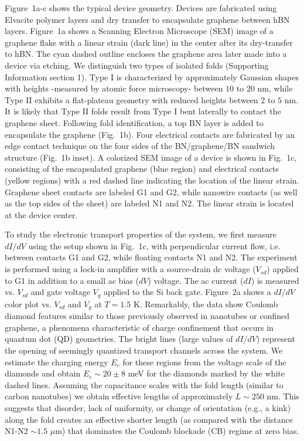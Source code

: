 \documentclass[journal=jacsat,manuscript=article]{achemso}
\begin{document}
Figure~1a-c shows the typical device geometry. Devices are fabricated using Elvacite polymer layers and dry transfer to encapsulate graphene between hBN layers\cite{wang2013one}. Figure~1a shows a Scanning Electron Microscope (SEM) image of a graphene flake with a linear strain (dark line) in the center after its dry-transfer to hBN. The cyan dashed outline encloses the graphene area later made into a device via etching. We distinguish two types of isolated folds (Supporting Information section 1)\cite{Zhu2012}. Type I is characterized by approximately Gaussian shapes with heights -measured by atomic force microscopy- between $10$ to $20$ nm, while Type II exhibits a flat-plateau geometry with reduced heights between $2$ to $5$ nm. It is likely that Type II folds result from Type I bent laterally to contact the graphene sheet\cite{Zhu2012}. Following fold identification, a top BN layer is added to encapsulate the graphene (Fig.~1b). Four electrical contacts are fabricated by an edge contact technique\cite{wang2013one} on the four sides of the BN/graphene/BN sandwich structure (Fig.~1b inset). A colorized SEM image of a device is shown in Fig.~1c, consisting of the encapsulated graphene (blue region) and electrical contacts (yellow regions) with a red dashed line indicating the location of the linear strain. Graphene sheet contacts are labeled G1 and G2, while nanowire contacts (as well as the top sides of the sheet) are labeled N1 and N2. The linear strain is located at the device center. 


To study the electronic transport properties of the system, we first measure $dI/dV$ using the setup shown in Fig.~1c, with perpendicular current flow, i.e. between contacts G1 and G2, while floating contacts N1 and N2. The experiment is performed using a lock-in amplifier with a source-drain dc voltage ($V_{sd}$) applied to G1 in addition to a small ac bias ($dV$) voltage. The ac current ($dI$) is measured vs. $V_{sd}$ and gate voltage $V_{g}$ applied to the Si back gate. Figure~2a shows a $dI/dV$ color plot  vs. $V_{sd}$ and $V_{g}$ at $T = 1.5$ K. Remarkably, the data show Coulomb diamond features similar to those previously observed in nanotubes\cite{laird_quantum_2015} or confined graphene\cite{ponomarenko2008chaotic}, a phenomena characteristic of charge confinement that occurs in quantum dot (QD) geometries. The bright lines (large values of $dI/dV$)  represent the opening of seemingly quantized transport channels across the system. We estimate the charging energy $E_{c}$ for these regions from the voltage scale of the diamonds\cite{Kouwenhoven1997} and obtain $E_c\sim 20\pm 8$ meV for the diamonds marked by the white dashed lines. Assuming the capacitance scales with the fold length (similar to carbon nanotubes) we obtain effective lengths of approximately $L \sim 250$ nm. This suggests that disorder, lack of uniformity, or change of orientation (e.g., a kink) along the fold creates an effective shorter length (as compared with the distance N1-N2 $\sim 1.5$ $\mu$m) that dominates the Coulomb blockade (CB) regime at zero bias. 
\end{document}
